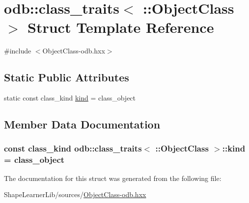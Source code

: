 \hypertarget{structodb_1_1class__traits_3_01_1_1_object_class_01_4}{}\section{odb\+:\+:class\+\_\+traits$<$ \+:\+:Object\+Class $>$ Struct Template Reference}
\label{structodb_1_1class__traits_3_01_1_1_object_class_01_4}


{\ttfamily \#include $<$Object\+Class-\/odb.\+hxx$>$}

\subsection*{Static Public Attributes}
\begin{DoxyCompactItemize}
\item 
static const class\+\_\+kind \hyperlink{structodb_1_1class__traits_3_01_1_1_object_class_01_4_a097e2cf807785b6862aee0704f999a1a}{kind} = class\+\_\+object
\end{DoxyCompactItemize}


\subsection{Member Data Documentation}
\hypertarget{structodb_1_1class__traits_3_01_1_1_object_class_01_4_a097e2cf807785b6862aee0704f999a1a}{}
\subsubsection[{kind}]{\setlength{\rightskip}{0pt plus 5cm}const class\+\_\+kind odb\+::class\+\_\+traits$<$ \+::{\bf Object\+Class} $>$\+::kind = class\+\_\+object\hspace{0.3cm}{\ttfamily [static]}}\label{structodb_1_1class__traits_3_01_1_1_object_class_01_4_a097e2cf807785b6862aee0704f999a1a}


The documentation for this struct was generated from the following file\+:\begin{DoxyCompactItemize}
\item 
Shape\+Learner\+Lib/sources/\hyperlink{_object_class-odb_8hxx}{Object\+Class-\/odb.\+hxx}\end{DoxyCompactItemize}
